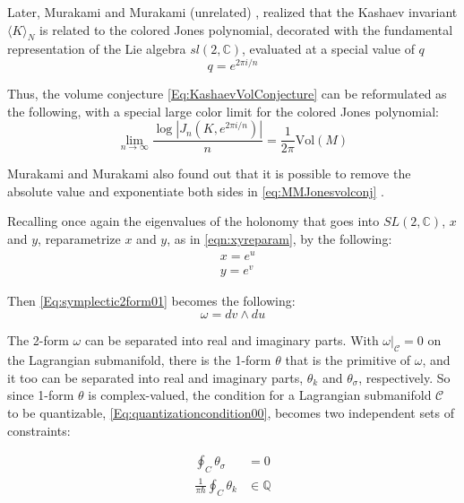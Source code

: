 \documentclass[a4paper,titlepage,twoside]{book}
\begin{document}
Later, Murakami and Murakami (unrelated) \cite{MurakamiMurakami1999}, realized that the Kashaev invariant $\langle K \rangle_N$ is related to the colored Jones polynomial, decorated with the fundamental representation of the Lie algebra $sl{(2,\mathbb{C})}$, evaluated at a special value of $q$
\begin{equation}
  q = e^{ 2\pi i / n}
\end{equation}

Thus, the volume conjecture \eqref{Eq:KashaevVolConjecture} can be reformulated as the following, with a special large color limit for the colored Jones polynomial:
\begin{equation}
\lim_{ n \to \infty} \frac{ \log{ |J_n{ ( K , e^{ 2\pi i / n} )} | } }{ n} = \frac{1}{ 2\pi } \text{Vol}{ (M)} \label{eq:MMJonesvolconj}
\end{equation}

Murakami and Murakami also found out that it is possible to remove the absolute value and exponentiate both sides in \eqref{eq:MMJonesvolconj} \cite{MurakamiMurakamiOkamotoTakataYokota2002}.  


Recalling once again the eigenvalues of the holonomy that goes into $SL{(2,\mathbb{C})}$, $x$ and $y$, reparametrize $x$ and $y$, as in \eqref{eqn:xyreparam}, by the following:
\[
  \begin{aligned}
    & x = e^u \\
    & y = e^v
\end{aligned}
\]

Then \eqref{Eq:symplectic2form01} becomes the following:
\begin{equation}
  \omega = dv \wedge du
\end{equation}

The 2-form $\omega$ can be separated into real and imaginary parts.  With $\left. \omega \right|_{\mathcal{C}} =0$ on the Lagrangian submanifold, there is the 1-form $\theta$ that is the primitive of $\omega$, and it too can be separated into real and imaginary parts, $\theta_k$ and $\theta_{\sigma}$, respectively.  So since 1-form $\theta$ is complex-valued, the condition for a Lagrangian submanifold $\mathcal{C}$ to be quantizable, \eqref{Eq:quantizationcondition00}, becomes two independent sets of constraints:

\begin{equation}
  \begin{aligned}
    \oint_C \theta_{\sigma} & =  0 \\ 
    \frac{1}{ \pi \hbar} \oint_C \theta_k & \in \mathbb{Q}
\end{aligned}
\end{equation}
\end{document}
